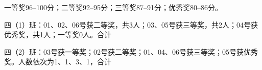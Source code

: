 {\par\medskip\noindent
{}一等奖96--100分；二等奖92--95分；三等奖87--91分；优秀奖80--86分。

四（1）班：01、02、06号获二等奖，共3人；03、05号获三等奖，共2人；04号获优秀奖，共1人；一等奖0人。合计
\par 四（2）班：03号获一等奖；02号获二等奖；01、04、06号获三等奖；05号获优秀奖。人数依次为1、1、3、1，合计
\par

}
